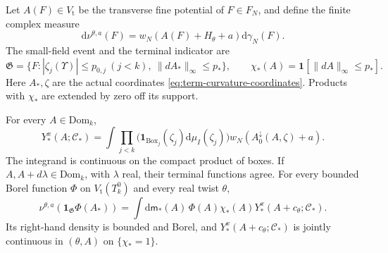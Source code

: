 \documentclass[11pt,letterpaper,reqno]{amsart}
\newcommand{\dd}{\mathrm d}
\begin{document}
Let $A(F)\in V_{\mathrm t}$ be the transverse fine
potential of $F\in F_N$, and define the finite complex
measure
\[
 \dd\nu^{\theta,a}(F)=
               w_N(A(F)+H_\theta+a)\dd\gamma_N(F).
\]
The small-field event and the terminal indicator are
\begin{equation}\label{eq:term-small-field-event}
 \mathfrak G=\{F:|\zeta_j(\Upsilon)|\le p_{0,j}\ (j<k),
                                 \ \|dA_*\|_\infty\le p_*\},\qquad
 \chi_*(A)=\mathbf1[\|dA\|_\infty\le p_*].
\end{equation}
Here $A_*,\zeta$ are the actual coordinates
\eqref{eq:term-curvature-coordinates}.
Products with $\chi_*$ are extended by zero off
its support.

\begin{theorem}\label{thm:term-density}
For every $A\in\mathrm{Dom}_k$,
\begin{equation}\label{eq:term-iterated-density}
 Y_*^x(A;\mathscr C_*)
      =\int\prod_{j<k}
                    \big(\mathbf1_{\mathrm{Box}_j}(\zeta_j)
                                             \dd\mu_I(\zeta_j)\big)
                       w_N(A_0^\downarrow(A,\zeta)+a).
\end{equation}
The integrand is continuous on the compact product
of boxes.
If $A,A+d\lambda\in\mathrm{Dom}_k$, with $\lambda$
real, their terminal functions agree.
For every bounded Borel function $\Phi$ on
$V_{\mathrm t}(T_k^0)$ and every real twist $\theta$,
\begin{equation}\label{eq:term-Borel-observable}
 \nu^{\theta,a}(\mathbf1_{\mathfrak G}\Phi(A_*))
    =\int\dd\mathsf m_*(A)\,
                        \Phi(A)\chi_*(A)Y_*^x(A+c_\theta;\mathscr C_*).
\end{equation}
Its right-hand density is bounded and Borel, and
$Y_*^x(A+c_\theta;\mathscr C_*)$ is jointly continuous
in $(\theta,A)$ on $\{\chi_*=1\}$.
\end{theorem}
\end{document}
